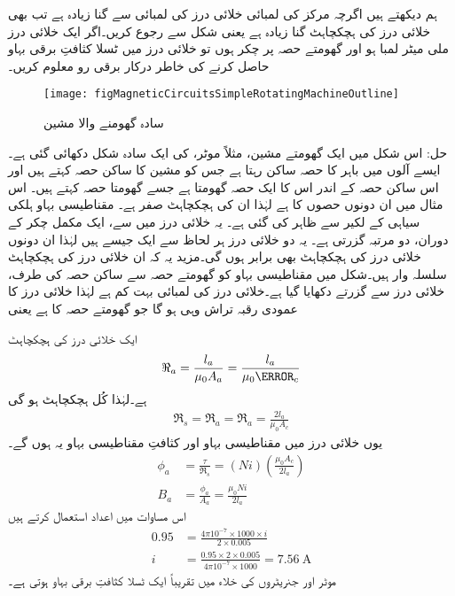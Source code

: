 ہم دیکھتے ہیں اگرچہ مرکز کی لمبائی خلائی درز کی لمبائی سے  گنا زیادہ ہے تب بھی خلائی درز کی ہچکچاہٹ  گنا زیادہ ہے یعنی  
%
شکل   سے رجوع کریں۔اگر ایک خلائی درز  ملی میٹر لمبا ہو اور گھومتے حصہ پر  چکر ہوں تو خلائی درز میں  ٹسلا کثافتِ برقی بہاو حاصل کرنے کی خاطر درکار برقی رو معلوم کریں۔
\begin{figure}
\centering
\texttt{[image: figMagneticCircuitsSimpleRotatingMachineOutline]}
\caption{سادہ گھومنے والا مشین}
\label{شکل_مقناطیسی_دور_سادہ_گھومتا_مشین}
\end{figure}
حل:
	 اس شکل میں ایک گھومتے مشین، مثلاً موٹر، کی ایک سادہ شکل دکھائی گئی ہے۔ ایسے آلوں میں باہر کا حصہ ساکن رہتا ہے جس کو مشین کا ساکن حصہ کہتے ہیں اور اس ساکن حصہ کے اندر اس کا ایک حصہ گھومتا ہے جسے گھومتا حصہ کہتے ہیں۔ اس مثال میں ان دونوں حصوں کا    ہے لہٰذا ان کی ہچکچاہٹ صفر ہے۔ مقناطیسی بہاو  ہلکی سیاہی کے لکیر سے ظاہر کی گئی ہے۔ یہ خلائی درز میں سے، ایک مکمل چکر کے دوران، دو مرتبہ گزرتی ہے۔ یہ دو خلائی درز ہر لحاظ سے ایک جیسے ہیں لہٰذا ان دونوں خلائی درز کی ہچکچاہٹ بھی برابر ہوں گی۔مزید یہ کہ ان خلائی درز کی ہچکچاہٹ سلسلہ وار ہیں۔شکل میں مقناطیسی بہاو کو گھومتے حصہ سے ساکن حصہ کی طرف، خلائی درز سے گزرتے دکھایا گیا ہے۔خلائی درز کی لمبائی  بہت کم ہے لہٰذا خلائی درز کا عمودی رقبہ تراش  وہی ہو گا جو گھومتے حصہ کا ہے یعنی  

  ایک خلائی درز کی ہچکچاہٹ
\begin{align*}
\Re_a=\frac{l_a}{\mu_0 A_a}=\frac{l_a}{\mu_0 \A_c}
\end{align*}
ہے۔لہٰذا کُل ہچکچاہٹ ہو گی
\begin{align*}
\Re_s=\Re_a=\Re_a=\frac{2 l_a}{\mu_0 A_c}
\end{align*}
یوں خلائی درز میں مقناطیسی بہاو  اور کثافتِ مقناطیسی بہاو  یہ ہوں گے۔
\begin{align*}
\phi_a&=\frac{\tau}{\Re_s}=\left(N i \right) \left (\frac{\mu_0 A_c}{2 l_a} \right)\\
B_a&=\frac{\phi_a}{A_a}=\frac{\mu_0 N i}{2 l_a}
\end{align*}
اس مساوات میں اعداد استعمال کرتے ہیں
\begin{align*}
0.95&=\frac{4 \pi 10^{-7} \times 1000 \times i}{2 \times 0.005}\\
i&=\frac{0.95 \times 2 \times 0.005}{ 4 \pi 10^{-7} \times 1000}=\SI{7.56}{\ampere}
\end{align*}
موٹر اور جنریٹروں کی خلاء میں تقریباً ایک ٹسلا کثافتِ برقی بہاو ہوتی ہے۔

